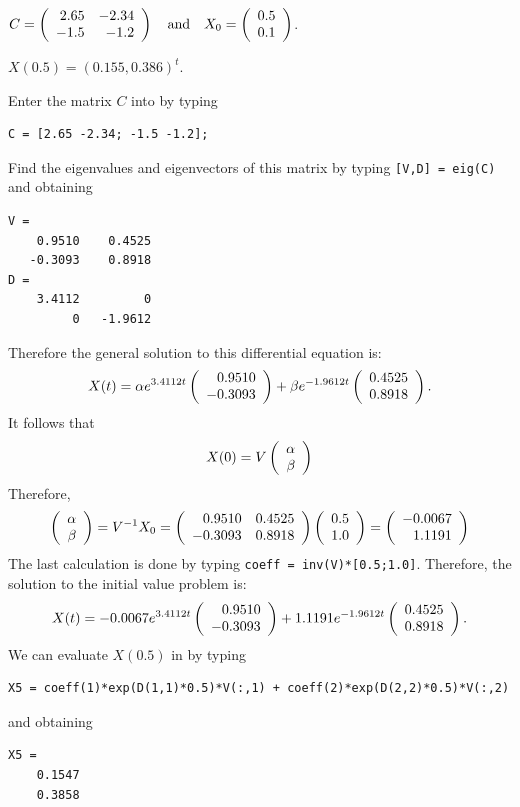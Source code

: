 \documentclass{ximera}
\begin{document}
\begin{computerExercise}  \label{c4.10A.4a}  
$C = \left(\begin{array}{rr} 2.65 & -2.34\\ -1.5 &-1.2\end{array}\right) \quad\mbox{and}\quad X_0=\left(\begin{array}{r} 0.5 \\ 0.1\end{array}\right)$.

\begin{solution}
\ans $X(0.5) = (0.155,0.386)^t$. 



\soln
Enter the matrix $C$ into \Matlab by typing
\begin{verbatim}
C = [2.65 -2.34; -1.5 -1.2];
\end{verbatim}
Find the eigenvalues and eigenvectors of this matrix by typing {\tt [V,D] = eig(C)}
and obtaining
\begin{verbatim}
V =
    0.9510    0.4525
   -0.3093    0.8918
D =
    3.4112         0
         0   -1.9612
\end{verbatim}
Therefore the general solution to this differential equation is:
\[
X(t) = \alpha e^{3.4112 t}\left(\begin{array}{r} 0.9510 \\ -0.3093\end{array}\right) +
\beta e^{-1.9612 t}\left(\begin{array}{r} 0.4525 \\ 0.8918\end{array}\right).
\]
It follows that 
\[
X(0) = V \left(\begin{array}{r} \alpha \\ \beta\end{array}\right)
\]
Therefore,
\[
\left(\begin{array}{r} \alpha \\ \beta\end{array}\right) = V^{-1} X_0 = 
\left(\begin{array}{rr} 0.9510 & 0.4525\\ -0.3093 &0.8918\end{array}\right)\left(\begin{array}{r} 0.5 \\ 1.0\end{array}\right) = \left(\begin{array}{r} -0.0067 \\ 1.1191\end{array}\right)
\]
The last calculation is done by typing {\tt coeff = inv(V)*[0.5;1.0]}. 
Therefore, the solution to the initial value problem is:
\[
X(t) = -0.0067e^{3.4112 t}\left(\begin{array}{r} 0.9510 \\ -0.3093\end{array}\right) +
1.1191e^{-1.9612 t}\left(\begin{array}{r} 0.4525 \\ 0.8918\end{array}\right).
\]
We can evaluate $X(0.5)$ in \Matlab by typing
\begin{verbatim}
X5 = coeff(1)*exp(D(1,1)*0.5)*V(:,1) + coeff(2)*exp(D(2,2)*0.5)*V(:,2)
\end{verbatim}
and obtaining
\begin{verbatim}
X5 =
    0.1547
    0.3858
\end{verbatim}




\end{solution}
\end{computerExercise}
\end{document}
